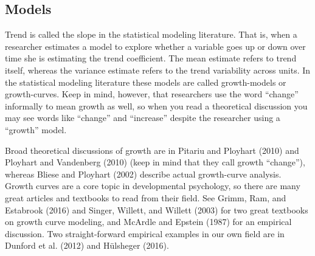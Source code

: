 \documentclass[english,,man]{apa6}
\theoremstyle{definition}
\theoremstyle{definition}
\theoremstyle{definition}
\theoremstyle{remark}
\begin{document}
\hypertarget{models}{%
\subsection{Models}\label{models}}

Trend is called the slope in the statistical modeling literature. That
is, when a researcher estimates a model to explore whether a variable
goes up or down over time she is estimating the trend coefficient. The
mean estimate refers to trend itself, whereas the variance estimate
refers to the trend variability across units. In the statistical
modeling literature these models are called growth-models or
growth-curves. Keep in mind, however, that researchers use the word
\enquote{change} informally to mean growth as well, so when you read a
theoretical discussion you may see words like \enquote{change} and
\enquote{increase} despite the researcher using a \enquote{growth}
model.

Broad theoretical discussions of growth are in Pitariu and Ployhart
(2010) and Ployhart and Vandenberg (2010) (keep in mind that they call
growth \enquote{change}), whereas Bliese and Ployhart (2002) describe
actual growth-curve analysis. Growth curves are a core topic in
developmental psychology, so there are many great articles and textbooks
to read from their field. See Grimm, Ram, and Estabrook (2016) and
Singer, Willett, and Willett (2003) for two great textbooks on growth
curve modeling, and McArdle and Epstein (1987) for an empirical
discussion. Two straight-forward empirical examples in our own field are
in Dunford et al. (2012) and Hülsheger (2016).
\end{document}
